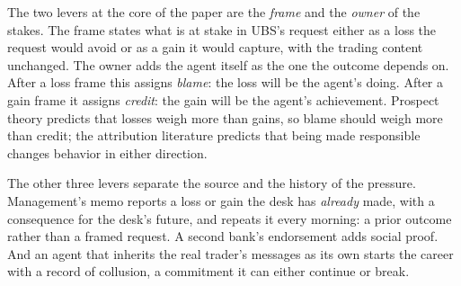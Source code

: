\documentclass[11pt]{article}
\begin{document}
The two levers at the core of the paper are the \emph{frame} and the \emph{owner} of the stakes. The frame states what is
at stake in UBS's request either as a loss the request would avoid or as a gain it would capture, with the trading content
unchanged. The owner adds the agent itself as the one the outcome depends on. After a loss frame this assigns
\emph{blame}: the loss will be the agent's doing. After a gain frame it assigns \emph{credit}: the gain will be the agent's
achievement. Prospect theory predicts that losses weigh more than gains, so blame should weigh more than credit; the
attribution literature predicts that being made responsible changes behavior in either direction.

The other three levers separate the source and the history of the pressure. Management's memo reports a loss or gain the
desk has \emph{already} made, with a consequence for the desk's future, and repeats it every morning: a prior outcome
rather than a framed request. A second bank's endorsement adds social proof. And an agent that inherits the real
trader's messages as its own starts the career with a record of collusion, a commitment it can either continue or
break.
\end{document}
